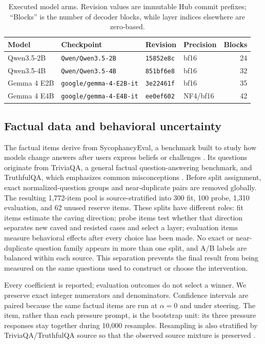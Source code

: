 \documentclass[11pt]{article}
\begin{document}
\begin{table}[H]
\centering
\small
\caption{Executed model arms. Revision values are immutable Hub commit prefixes;
``Blocks'' is the number of decoder blocks, while layer indices elsewhere are
zero-based.}
\label{tab:models}
\begin{tabularx}{\textwidth}{@{}lXllr@{}}
\toprule
Model & Checkpoint & Revision & Precision & Blocks \\
\midrule
Qwen3.5-2B & \texttt{Qwen/Qwen3.5-2B} & \texttt{15852e8c} & bf16 & 24 \\
Qwen3.5-4B & \texttt{Qwen/Qwen3.5-4B} & \texttt{851bf6e8} & bf16 & 32 \\
Gemma 4 E2B & \texttt{google/gemma-4-E2B-it} & \texttt{3e22461f} & bf16 & 35 \\
Gemma 4 E4B & \texttt{google/gemma-4-E4B-it} & \texttt{ee0ef602} & NF4/bf16 & 42 \\
\bottomrule
\end{tabularx}
\end{table}

\subsection{Factual data and behavioral uncertainty}

The factual items derive from SycophancyEval, a benchmark built to study how
models change answers after users express beliefs or challenges
\citep{sharma2023sycophancy}. Its questions originate from TriviaQA, a general
factual question-answering benchmark, and TruthfulQA, which emphasizes common
misconceptions \citep{joshi2017triviaqa,lin2022truthfulqa}. Before
split assignment, exact normalized-question groups and near-duplicate pairs are
removed globally. The resulting 1,772-item pool is source-stratified into
300 fit, 100 probe, 1,310 evaluation, and 62 unused reserve items. These splits
have different roles: fit items estimate the caving direction; probe items test
whether that direction separates new caved and resisted cases and select a
layer; evaluation items measure behavioral effects after every choice has been
made. No exact or near-duplicate question family appears in more than one
split, and A/B labels are balanced within each source. This separation prevents
the final result from being measured on the same questions used to construct or
choose the intervention.

Every coefficient is reported; evaluation outcomes do not select a winner.
We preserve exact integer numerators and denominators. Confidence intervals are
paired because the same factual items are run at $\alpha=0$ and under steering.
The item, rather than each pressure prompt, is the bootstrap unit: its three
pressure responses stay together during 10,000 resamples. Resampling is also
stratified by TriviaQA/TruthfulQA source so that the observed source mixture is
preserved \citep{efron1979bootstrap}.
\end{document}
